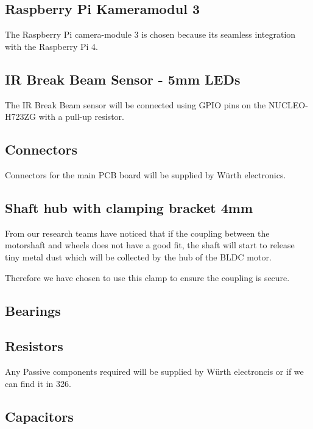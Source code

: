 \documentclass[a4paper,12pt]{article}
\begin{document}
  \subsection*{Raspberry Pi Kameramodul 3}

  The Raspberry Pi camera-module 3 is chosen because its seamless
  integration with the Raspberry Pi 4.

  \subsection*{IR Break Beam Sensor - 5mm LEDs}

  The IR Break Beam sensor will be connected using GPIO pins on the
  NUCLEO-H723ZG with a pull-up resistor.

  \subsection*{Connectors}

  Connectors for the main PCB board will be supplied by Würth
  electronics.

  \subsection*{Shaft hub with clamping bracket 4mm}

  From our research teams have noticed that if the coupling between the
  motorshaft and wheels does not have a good fit, the shaft will start
  to release tiny metal dust which will be collected by the hub of the
  BLDC motor.

  Therefore we have chosen to use this clamp to ensure the coupling is
  secure.

  \subsection*{Bearings}

  \subsection*{Resistors}

  Any Passive components required will be supplied by Würth electroncis
  or if we can find it in 326.

  \subsection*{Capacitors}
\end{document}
